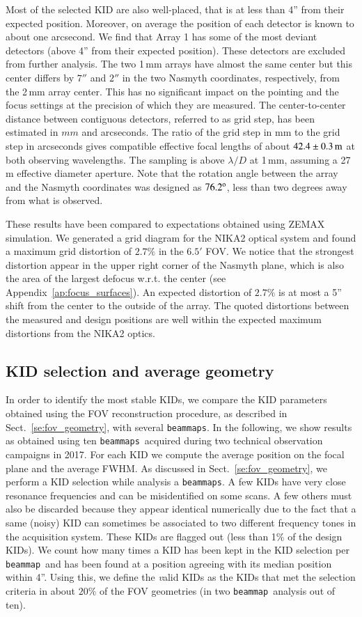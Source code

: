 \documentclass[traditionalabstract]{aa}
\newcommand{\bm}{{\tt beammap}}
\newcommand{\bms}{{\tt beammaps}}
\newcommand{\lp}[1]{#1}
\begin{document}
Most of the selected KID are also well-placed, that is at less than 4'' from
their expected position. Moreover, on average the position of each
detector is known to about one arcsecond. We find
that Array 1 has some of the most deviant detectors (above 4''
from their expected position). These detectors are excluded from
further analysis. The two 1\,mm arrays have almost
the same center but this center differs by $7''$ and $2''$ in the two Nasmyth
coordinates, respectively, from the 2\,mm array center.
This has no significant impact on the pointing and the focus settings
at the precision of which they are measured.
{\lp The center-to-center distance between
contiguous detectors, referred to as grid step, has been estimated in
$mm$ and arcseconds. The ratio of the grid step in mm to
the grid step in arcseconds gives compatible effective focal lengths
of about $42.4\pm0.3\,\rm{m}$ at both observing wavelengths.} The sampling is above $\lambda/D$ at
1\,mm, assuming a 27\,m effective diameter aperture. Note that
the rotation angle between the array and the Nasmyth
coordinates was designed as $76.2^{\rm{o}}$, less than two degrees
away from what is observed.


These results have been compared to expectations obtained using ZEMAX
simulation. 
We generated a grid diagram for the NIKA2 optical system and found a maximum
grid distortion of $2.7\%$ in the $6.5'$ FOV. We notice that the
strongest distortion appear in the upper right corner of the Nasmyth plane, which is
also the area of the largest defocus w.r.t. the center (see Appendix~\ref{ap:focus_surfaces}).
An expected distortion of $2.7\%$ is at most a 5'' shift from the
center to the outside of the array. The quoted distortions between the
measured and design positions are well within the expected
maximum distortions from the NIKA2 optics.

\subsection{KID selection and average geometry}
\label{se:avg_kidpar}

In order to identify the most stable KIDs, we compare the KID parameters
obtained using the FOV reconstruction procedure, as described in
Sect.~\ref{se:fov_geometry}, with several \bms. In the following, we
show results as obtained using {\lp ten} \bms\ acquired during two
technical observation campaigns in 2017.
For each KID we compute the average position on the focal plane and
the average FWHM. 
As discussed in Sect.~\ref{se:fov_geometry}, we perform a KID
selection while analysis a \bms. A few KIDs have very close resonance
frequencies and can be misidentified on some scans. A few others must
also be discarded because they appear identical
numerically due to the fact that a same (noisy) KID can sometimes be
associated to two different frequency tones in the acquisition system.
These KIDs are flagged out (less than 1\% of the design KIDs).
{\lp We count how many times a KID has been kept in
the KID selection per \bm\ and has been found at a position agreeing
with its median position within 4''.}
Using this, we define the {\emph valid} KIDs as the KIDs that met the selection
criteria in about {\lp $20\%$} of the FOV geometries (in two \bm\
analysis out of ten).
\end{document}
